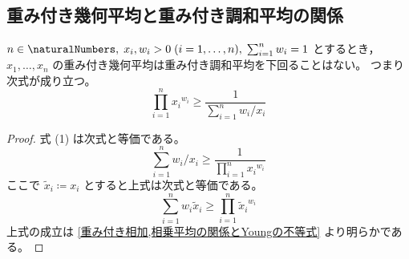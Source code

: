         \subsection{重み付き幾何平均と重み付き調和平均の関係}
            \begin{shadebox}
                $n\in\naturalNumbers,\;x_i,w_i>0\;(i=1,\dots,n),\;\sum_{i=1}^n w_i = 1$ とするとき，$x_1,\dots,x_n$ の重み付き幾何平均は重み付き調和平均を下回ることはない。
                つまり次式が成り立つ。
                \[ \prod_{i=1}^n {x_i}^{w_i} \geq \frac{1}{\sum_{i=1}^n w_i/x_i} \tag{1} \]
            \end{shadebox}
            \begin{proof}
                \quad\par
                式 (1) は次式と等価である。
                \[ \sum_{i=1}^n w_i/x_i \geq \frac{1}{\prod_{i=1}^n {x_i}^{w_i}} \]
                ここで $\tilde{x}_i \coloneq x_i$ とすると上式は次式と等価である。
                \[ \sum_{i=1}^n w_i\tilde{x}_i \geq \prod_{i=1}^n {\tilde{x}_i}^{w_i} \]
                上式の成立は \ref{重み付き相加,相乗平均の関係とYoungの不等式} より明らかである。
            \end{proof}

